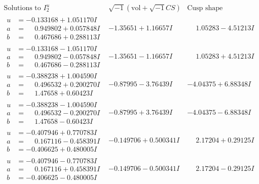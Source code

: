 \documentclass[1p]{elsarticle_modified}
\theoremstyle{definition}
\newcommand{\I}{\sqrt{-1}}
\begin{document}
$$\begin{array}{c|c|c}  
\text{Solutions to }I^u_{2}& \I (\text{vol} + \sqrt{-1}CS) & \text{Cusp shape}\\
 \hline 
\begin{aligned}
u &= -0.133168 + 1.051170 I \\
a &= \phantom{-}0.949802 + 0.057848 I \\
b &= \phantom{-}0.467686 + 0.288113 I\end{aligned}
 & -1.35651 + 1.16657 I & \phantom{-}1.05283 - 4.51213 I \\ \hline\begin{aligned}
u &= -0.133168 - 1.051170 I \\
a &= \phantom{-}0.949802 - 0.057848 I \\
b &= \phantom{-}0.467686 - 0.288113 I\end{aligned}
 & -1.35651 - 1.16657 I & \phantom{-}1.05283 + 4.51213 I \\ \hline\begin{aligned}
u &= -0.388238 + 1.004590 I \\
a &= \phantom{-}0.496532 + 0.200270 I \\
b &= \phantom{-}1.47658 + 0.60423 I\end{aligned}
 & -0.87995 - 3.76439 I & -4.04375 + 6.88348 I \\ \hline\begin{aligned}
u &= -0.388238 - 1.004590 I \\
a &= \phantom{-}0.496532 - 0.200270 I \\
b &= \phantom{-}1.47658 - 0.60423 I\end{aligned}
 & -0.87995 + 3.76439 I & -4.04375 - 6.88348 I \\ \hline\begin{aligned}
u &= -0.407946 + 0.770783 I \\
a &= \phantom{-}0.167116 - 0.458391 I \\
b &= -0.406625 + 0.480005 I\end{aligned}
 & -0.149706 + 0.500341 I & \phantom{-}2.17204 + 0.29125 I \\ \hline\begin{aligned}
u &= -0.407946 - 0.770783 I \\
a &= \phantom{-}0.167116 + 0.458391 I \\
b &= -0.406625 - 0.480005 I\end{aligned}
 & -0.149706 - 0.500341 I & \phantom{-}2.17204 - 0.29125 I \\ \hline\begin{aligned}

\end{aligned}
\end{array}$$
\end{document}

